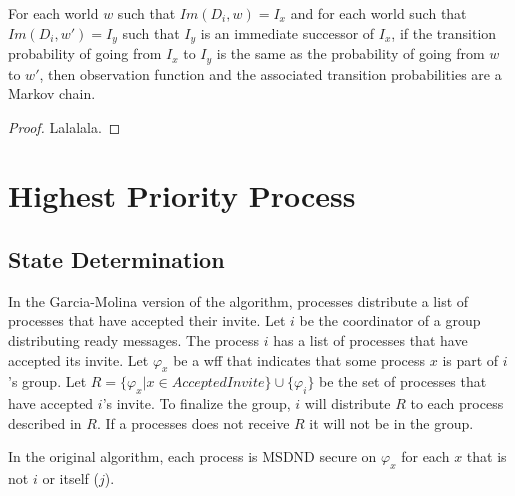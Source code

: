 \begin{thm}
For each world $w$ such that $Im(D_i,w) = I_x$ and for each world such that $Im(D_i,w') = I_y$ such that $I_y$ is an immediate successor of $I_x$, if the transition probability of going from $I_x$ to $I_y$ is the same as the probability of going from $w$ to $w'$, then observation function and the associated transition probabilities are a Markov chain.
\end{thm}
\begin{proof}
Lalalala.
\end{proof}

\section{Highest Priority Process}

\subsection{State Determination}

In the Garcia-Molina version of the algorithm, processes distribute a list of processes that have accepted their invite.
Let $i$ be the coordinator of a group distributing ready messages.
The process $i$ has a list of processes that have accepted its invite.
Let $\varphi_x$ be a wff that indicates that some process $x$ is part of $i$'s group.
Let $R = \{ \varphi_x | x \in AcceptedInvite \} \cup \{ \varphi_i \}$ be the set of processes that have accepted $i$'s invite.
To finalize the group, $i$ will distribute $R$ to each process described in $R$.
If a processes does not receive $R$ it will not be in the group.

\begin{thm}
    In the original algorithm, each process is MSDND secure on $\varphi_x$ for each $x$ that is not $i$ or itself ($j$).
\end{thm}

